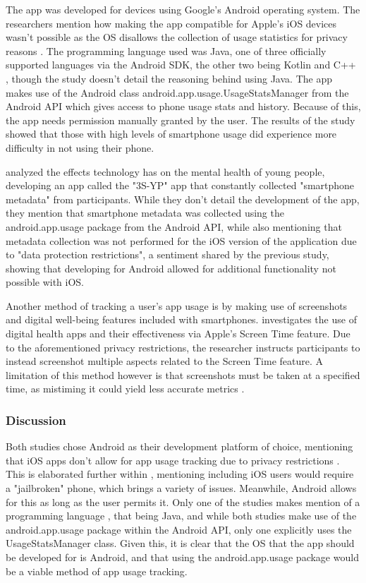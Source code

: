 \documentclass[12pt]{article}
\begin{document}
The app was developed for devices using Google's Android operating system. The researchers
mention how making the app compatible for Apple's iOS devices wasn't possible as the OS
disallows the collection of usage statistics for privacy reasons . 
The programming language used was Java, one of three officially supported languages via the Android SDK, 
the other two being Kotlin and C++ , though the study doesn't detail the 
reasoning behind using Java. The app makes use of the Android class 
\newline android.app.usage.UsageStatsManager from the 
Android API which gives access to phone usage stats and history. Because of this, the app needs permission 
manually granted by the user. The results of the study showed that those with high levels of smartphone usage 
did experience more difficulty in not using their phone. \newline

 analyzed the effects technology has on 
the mental health of young people, developing an app called the "3S-YP" app 
that constantly collected "smartphone metadata" from participants. 
While they don't detail the development of the app, they mention that smartphone metadata was collected using 
the android.app.usage package from the Android API, while also mentioning that metadata collection was not 
performed for the iOS version of the application due to "data protection restrictions", a sentiment shared by the 
previous study, showing that developing for Android allowed for additional functionality not possible with iOS.\newline

Another method of tracking a user's app usage is by making use of screenshots
and digital well-being features included with smartphones. 
investigates the use of digital health apps and their effectiveness via Apple's Screen Time feature. 
Due to the aforementioned privacy restrictions, the researcher instructs participants to instead 
screenshot multiple aspects related to the Screen Time feature. A limitation of this method however is that 
screenshots must be taken at a specified time, as mistiming it could yield less accurate 
metrics .

\subsubsection{Discussion}
Both studies chose Android as their development platform of choice, mentioning that iOS apps don't allow for app 
usage tracking due to privacy restrictions 
. 
This is elaborated further within , mentioning including iOS users 
would require a "jailbroken" phone, which brings a variety of issues. Meanwhile, Android allows for this as 
long as the user permits it. Only one of the studies makes mention of a programming language 
, that being Java, and while both studies make use of the
android.app.usage package within the Android API, only one
explicitly uses the UsageStatsManager class. Given this, it is clear that the OS that the app 
should be developed for is Android, and that using the android.app.usage package would be a viable method of app 
usage tracking.
\newpage
\end{document}
